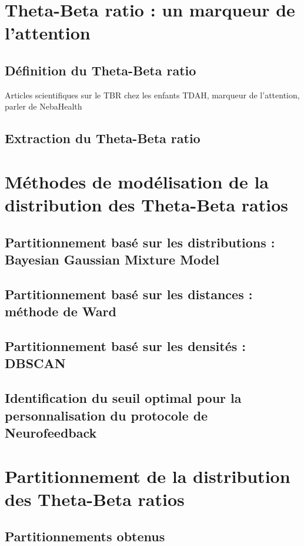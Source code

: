\section{Theta-Beta ratio : un marqueur de l'attention}

\subsection{Définition du Theta-Beta ratio}
Articles scientifiques sur le TBR chez les enfants TDAH, marqueur de l'attention, parler de NebaHealth

\subsection{Extraction du Theta-Beta ratio}

\section{Méthodes de modélisation de la distribution des Theta-Beta ratios}

\subsection{Partitionnement basé sur les distributions : Bayesian Gaussian Mixture Model} \label{bgmm}

\subsection{Partitionnement basé sur les distances : méthode de Ward}

\subsection{Partitionnement basé sur les densités : DBSCAN}

\subsection{Identification du seuil optimal pour la personnalisation du protocole de Neurofeedback}

\section{Partitionnement de la distribution des Theta-Beta ratios}

\subsection{Partitionnements obtenus}

